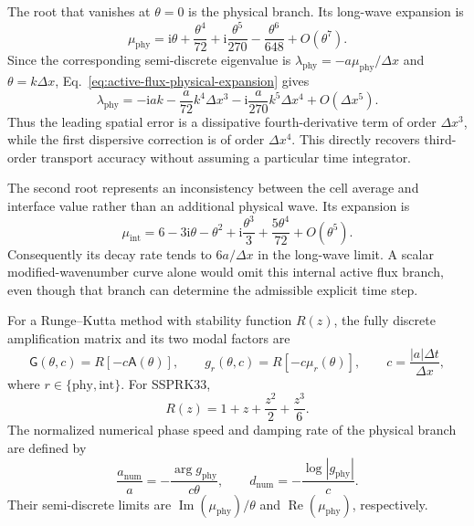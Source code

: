 \documentclass[preprint,3p,12pt]{elsarticle}
\begin{document}
The root that vanishes at $\theta=0$ is the physical branch. Its long-wave expansion is
\begin{equation}
  \mu_{\mathrm{phy}}
  =\mathrm{i}\theta+\frac{\theta^4}{72}
  +\mathrm{i}\frac{\theta^5}{270}
  -\frac{\theta^6}{648}+O(\theta^7).
  \label{eq:active-flux-physical-expansion}
\end{equation}
Since the corresponding semi-discrete eigenvalue is $\lambda_{\mathrm{phy}}=-a\mu_{\mathrm{phy}}/\Delta x$ and $\theta=k\Delta x$, Eq.~\eqref{eq:active-flux-physical-expansion} gives
\begin{equation}
  \lambda_{\mathrm{phy}}
  =-\mathrm{i}ak
  -\frac{a}{72}k^4\Delta x^3
  -\mathrm{i}\frac{a}{270}k^5\Delta x^4
  +O(\Delta x^5).
  \label{eq:active-flux-modified-wavenumber}
\end{equation}
Thus the leading spatial error is a dissipative fourth-derivative term of order $\Delta x^3$, while the first dispersive correction is of order $\Delta x^4$. This directly recovers third-order transport accuracy without assuming a particular time integrator.

The second root represents an inconsistency between the cell average and interface value rather than an additional physical wave. Its expansion is
\begin{equation}
  \mu_{\mathrm{int}}
  =6-3\mathrm{i}\theta-\theta^2
  +\mathrm{i}\frac{\theta^3}{3}
  +\frac{5\theta^4}{72}+O(\theta^5).
  \label{eq:active-flux-internal-expansion}
\end{equation}
Consequently its decay rate tends to $6a/\Delta x$ in the long-wave limit. A scalar modified-wavenumber curve alone would omit this internal active flux branch, even though that branch can determine the admissible explicit time step.

For a Runge--Kutta method with stability function $R(z)$, the fully discrete amplification matrix and its two modal factors are
\begin{equation}
  \mathsf{G}(\theta,c)
  =R\!\left[-c\mathsf{A}(\theta)\right],
  \qquad
  g_r(\theta,c)=R\!\left[-c\mu_r(\theta)\right],
  \qquad
  c=\frac{|a|\Delta t}{\Delta x},
  \label{eq:active-flux-amplification-matrix}
\end{equation}
where $r\in\{\mathrm{phy},\mathrm{int}\}$. For SSPRK33,
\begin{equation}
  R(z)=1+z+\frac{z^2}{2}+\frac{z^3}{6}.
  \label{eq:ssprk33-stability-function}
\end{equation}
The normalized numerical phase speed and damping rate of the physical branch are defined by
\begin{equation}
  \frac{a_{\mathrm{num}}}{a}
  =-\frac{\arg g_{\mathrm{phy}}}{c\theta},
  \qquad
  d_{\mathrm{num}}
  =-\frac{\log|g_{\mathrm{phy}}|}{c}.
  \label{eq:active-flux-phase-damping}
\end{equation}
Their semi-discrete limits are $\operatorname{Im}(\mu_{\mathrm{phy}})/\theta$ and $\operatorname{Re}(\mu_{\mathrm{phy}})$, respectively.
\end{document}
